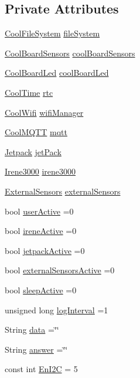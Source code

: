 \subsection*{Private Attributes}
\begin{DoxyCompactItemize}
\item 
\hyperlink{class_cool_file_system}{Cool\+File\+System} \hyperlink{class_cool_board_a42c2586fbb13ff7f06538e9284e8538d}{file\+System}
\item 
\hyperlink{class_cool_board_sensors}{Cool\+Board\+Sensors} \hyperlink{class_cool_board_af102be5288bd7f7a8e59b13f86e26a00}{cool\+Board\+Sensors}
\item 
\hyperlink{class_cool_board_led}{Cool\+Board\+Led} \hyperlink{class_cool_board_a1b1d3c684a5baa56b08486e192fd8e97}{cool\+Board\+Led}
\item 
\hyperlink{class_cool_time}{Cool\+Time} \hyperlink{class_cool_board_a50d2a6716879d64a85f3c6b44ad63275}{rtc}
\item 
\hyperlink{class_cool_wifi}{Cool\+Wifi} \hyperlink{class_cool_board_acd88e6003606b47479ebba81e4aceeca}{wifi\+Manager}
\item 
\hyperlink{class_cool_m_q_t_t}{Cool\+M\+Q\+TT} \hyperlink{class_cool_board_a2399f44d7c23c1149a335cb3b46d90f1}{mqtt}
\item 
\hyperlink{class_jetpack}{Jetpack} \hyperlink{class_cool_board_a30b1357881b01ccbec676856a91e48e9}{jet\+Pack}
\item 
\hyperlink{class_irene3000}{Irene3000} \hyperlink{class_cool_board_ad103718ce316006c4695b8eb312eaf11}{irene3000}
\item 
\hyperlink{class_external_sensors}{External\+Sensors} \hyperlink{class_cool_board_a09e26264839c65873eb56af476eff6b2}{external\+Sensors}
\item 
bool \hyperlink{class_cool_board_a6395459131d6889a3005f79c7a35e964}{user\+Active} =0
\item 
bool \hyperlink{class_cool_board_a9c3f7ac625481ee2ae802a25d97a4ae0}{irene\+Active} =0
\item 
bool \hyperlink{class_cool_board_a9be03a913d26e558328935ca3b59a75e}{jetpack\+Active} =0
\item 
bool \hyperlink{class_cool_board_a638b00b76aeb819ecfd4c10b8cdd7bb7}{external\+Sensors\+Active} =0
\item 
bool \hyperlink{class_cool_board_a0a51b2287139f66c738101fb53139230}{sleep\+Active} =0
\item 
unsigned long \hyperlink{class_cool_board_a84bc94413b64973e4aba8c467c97006c}{log\+Interval} =1
\item 
String \hyperlink{class_cool_board_a427fb753dd8575bdf821c70a5c63d695}{data} =\char`\"{}\char`\"{}
\item 
String \hyperlink{class_cool_board_a7b835fafd449e5282f7f91d787a2dc15}{answer} =\char`\"{}\char`\"{}
\item 
const int \hyperlink{class_cool_board_af1fe1376fc66f93dee80b327ca695377}{En\+I2C} = 5
\end{DoxyCompactItemize}


